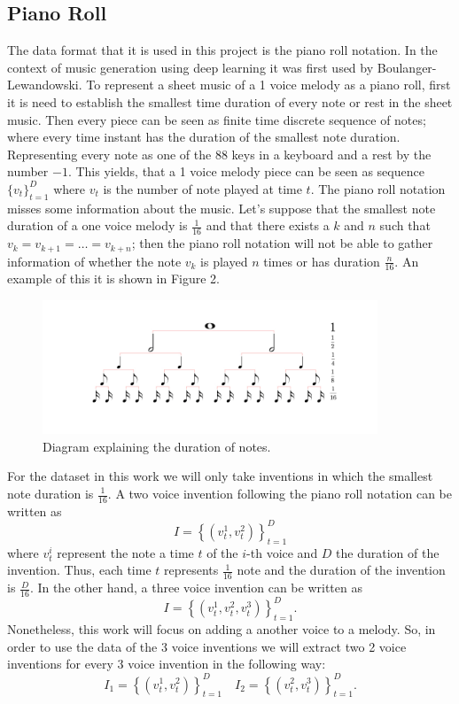 \documentclass{article}
\begin{document}
\subsection*{Piano Roll}

The data format that it is used in this project is the piano roll notation. In the context of music generation using deep learning it was first used by Boulanger-Lewandowski\cite{Boulanger-Lewandowski}. To represent a sheet music of a 1 voice melody as a piano roll, first it is need to establish the smallest time duration of every note or rest in the sheet music. Then every piece can be seen as  finite time discrete sequence of notes; where every time instant has the duration of the smallest note duration. Representing every note as one of the 88 keys in a keyboard and a rest by the number $-1$. This yields, that a 1 voice melody piece can be seen as sequence $\{v_{t}\}_{t=1}^D$ where $v_t$ is the number of note played at time $t$. 
\noindent
The piano roll notation misses some information about the music. Let's suppose that the smallest note duration of a one voice melody is $\frac{1}{16}$ and that there exists a $k$ and $n$ such that $v_{k}=v_{k+1}=\dots = v_{k+n}$; then the piano roll notation will not be able to gather information of whether the note $v_{k}$ is played $n$ times or has duration $\frac{n}{16}$. An example of this it is shown in Figure 2. 
\begin{figure}[H]
\includegraphics[width=10cm]{Images/duration.png}
\centering
\caption{Diagram explaining the duration of notes.}
\end{figure}
\noindent
For the dataset in this work we will only take inventions in which the smallest note duration is $\frac{1}{16}$. A two voice invention following the piano roll notation can be written as
$$I = \left\{(v^{1}_t,v^{2}_t)\right\}_{t=1}^D$$
where $v^{i}_t$ represent the note a time $t$ of the $i$-th voice and $D$ the duration of the invention. Thus, each time $t$ represents $\frac{1}{16}$ note and the duration of the invention is $\frac{D}{16}$.
In the other hand, a three voice invention can be written as
$$I = \left\{(v^{1}_t,v^{2}_t,v^{3}_t)\right\}_{t=1}^D.$$
Nonetheless, this work will focus on adding a another voice to a melody. So, in order to use the data of the 3 voice inventions we will extract two 2 voice inventions for every 3 voice invention in the following way:
$$I_1 = \left\{(v^{1}_t,v^{2}_t)\right\}_{t=1}^D\quad I_2 = \left\{(v^{2}_t,v^{3}_t)\right\}_{t=1}^D.$$ 
\end{document}
